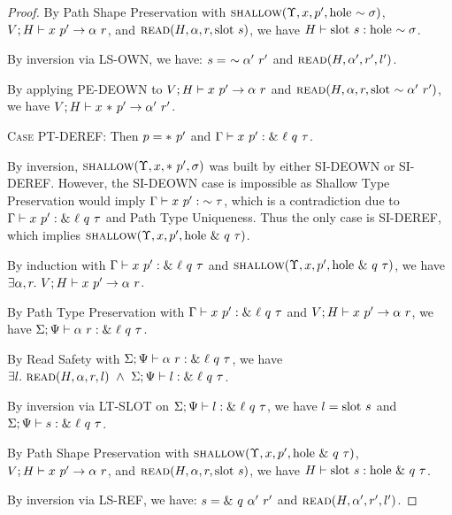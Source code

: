 \documentclass{article}
\begin{document}
\begin{proof}
    By Path Shape Preservation with $\textsc{shallow}({\Upsilon},{x},{p'},{\textrm{hole}\ {\sim {\sigma}}})$,
    ${{V};{H}} \vdash {{x}\ {p'}} \rightarrow {{\alpha}\ {r}}$, and $\textsc{read}({H},{\alpha},{r},{\textrm{slot}\ {s}})$, we have
    ${H} \vdash {\textrm{slot}\ {s}} : {\textrm{hole}\ {\sim {\sigma}}}$.

    By inversion via \textsc{LS-OWN}, we have: $s =\ \sim {{\alpha'}\ {r'}}$ and
    $\textsc{read}({H},{\alpha'},{r'},{l'})$.

    By applying \textsc{PE-DEOWN} to ${{V};{H}} \vdash {{x}\ {p'}} \rightarrow {{\alpha}\ {r}}$ and
    $\textsc{read}({H},{\alpha},{r},{\textrm{slot}\ {\sim {{\alpha'}\ {r'}}}})$, we have
    ${{V};{H}} \vdash {{x}\ {*\ {p'}}} \rightarrow {{\alpha'}\ {r'}}$.

  \textsc{Case PT-DEREF}:
    Then $p = *\ {p'}$ and ${{\Gamma}} \vdash {{x}\ {p'}} : {{\&\ {\ell}\ {q}\ {\tau}}}$.

    By inversion, $\textsc{shallow}({\Upsilon},{x},{*\ {p'}},{\sigma})$ was built by either
    \textsc{SI-DEOWN} or \textsc{SI-DEREF}. However, the \textsc{SI-DEOWN} case is
    impossible as Shallow Type Preservation would imply
    ${{\Gamma}} \vdash {{x}\ {p'}} : {{\sim {\tau}}}$, which is a contradiction due to
    ${{\Gamma}} \vdash {{x}\ {p'}} : {{\&\ {\ell}\ {q}\ {\tau}}}$ and Path Type Uniqueness.
    Thus the only case is \textsc{SI-DEREF}, which implies
    $\textsc{shallow}({\Upsilon},{x},{p'},{\textrm{hole}\ {\&\ {q}\ {\tau}}})$.

    By induction with ${{\Gamma}} \vdash {{x}\ {p'}} : {{\&\ {\ell}\ {q}\ {\tau}}}$ and
    $\textsc{shallow}({\Upsilon},{x},{p'},{\textrm{hole}\ {\&\ {q}\ {\tau}}})$, we have
    $\exists \alpha, r.\ \PEval{V}{H}{x}{p'}{\alpha}{r}$.

    By Path Type Preservation with ${{\Gamma}} \vdash {{x}\ {p'}} : {{\&\ {\ell}\ {q}\ {\tau}}}$ and
    ${{V};{H}} \vdash {{x}\ {p'}} \rightarrow {{\alpha}\ {r}}$, we have
    ${{{\Sigma}} ;{{\Psi}}} \vdash {{{\alpha}\ {r}}} : {{{\&\ {\ell}\ {q}\ {\tau}}}}$.

    By Read Safety with ${{{\Sigma}} ;{{\Psi}}} \vdash {{{\alpha}\ {r}}} : {{{\&\ {\ell}\ {q}\ {\tau}}}}$, we have
    $\exists l.\ \Read{H}{\alpha}{r}{l}\ \land\ \RTType{\Sigma}{\Psi}{l}{\Ref{\ell}{q}{\tau}}$.

    By inversion via \textsc{LT-SLOT} on ${{\Sigma} ;{\Psi}} \vdash {{l}} : {{\&\ {\ell}\ {q}\ {\tau}}}$,
    we have $l = \textrm{slot}\ {s}$ and ${{\Sigma} ;{\Psi}} \vdash {{s}} : {{\&\ {\ell}\ {q}\ {\tau}}}$.

    By Path Shape Preservation with $\textsc{shallow}({\Upsilon},{x},{p'},{\textrm{hole}\ {\&\ {q}\ {\tau}}})$,
    ${{V};{H}} \vdash {{x}\ {p'}} \rightarrow {{\alpha}\ {r}}$, and $\textsc{read}({H},{\alpha},{r},{\textrm{slot}\ {s}})$, we have
    ${H} \vdash {\textrm{slot}\ {s}} : {\textrm{hole}\ {\&\ {q}\ {\tau}}}$.

    By inversion via \textsc{LS-REF}, we have: $s = \&\ {q}\ {\alpha'}\ {r'}$ and
    $\textsc{read}({H},{\alpha'},{r'},{l'})$.


\end{proof}
\end{document}
